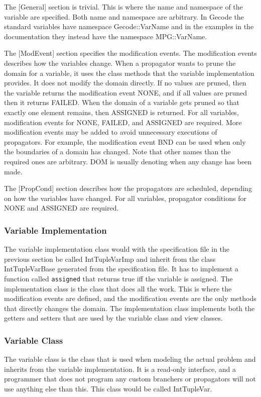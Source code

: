 \documentclass[a4paper,11pt]{article}
\begin{document}
The [General] section is trivial. This is where the name and namespace of the variable are specified. Both name and namespace are arbitrary. In Gecode the standard variables have namespace Gecode::VarName and in the examples in the documentation they instead have the namespace MPG::VarName.

The [ModEvent] section specifies the modification events. The modification events describes how the variables change. When a propagator wants to prune the domain for a variable, it uses the class methods that the variable implementation provides. It does not modify the domain directly. If no values are pruned, then the variable returns the modification event NONE, and if all values are pruned then it returns FAILED. When the domain of a variable gets pruned so that exactly one element remains, then ASSIGNED is returned. For all variables, modification events for NONE, FAILED, and ASSIGNED are required. More modification events may be added to avoid unnecessary executions of propagators. For example, the modification event BND can be used when only the boundaries of a domain has changed. Note that other names than the required ones are arbitrary. DOM is usually denoting when any change has been made.

The [PropCond] section describes how the propagators are scheduled, depending on how the variables have changed. For all variables, propagator conditions for NONE and ASSIGNED are required.

\subsubsection{Variable Implementation}
The variable implementation class would with the specification file in the previous section be called IntTupleVarImp and inherit from the class IntTupleVarBase generated from the specification file. It has to implement a function called \texttt{assigned} that returns true iff the variable is assigned. The implementation class is the class that does all the work. This is where the modification events are defined, and the modification events are the only methods that directly changes the domain. The implementation class implements both the getters and setters that are used by the variable class and view classes.

\subsubsection{Variable Class}
The variable class is the class that is used when modeling the actual problem and inherits from the variable implementation. It is a read-only interface, and a programmer that does not program any custom branchers or propagators will not use anything else than this. This class would be called IntTupleVar.
\end{document}
